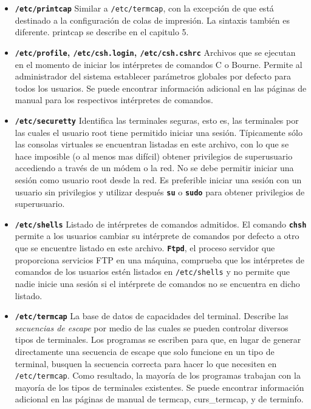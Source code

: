 \documentclass[12pt]{article}
\begin{document}
\begin{itemize}
	
	\item \textbf{\texttt{/etc/printcap}}
	 Similar a \texttt{/etc/termcap}, con la
	excepción de que está destinado a la configuración de colas de
	impresión. La sintaxis también es diferente.  printcap se describe en el
	capitulo 5.   
	

	
	\item \textbf{\texttt{/etc/profile},
	\texttt{/etc/csh.login},
	\texttt{/etc/csh.cshrc}}  Archivos
	que se ejecutan en el momento de iniciar los intérpretes de comandos C o
	Bourne. Permite al administrador del sistema establecer parámetros
	globales por defecto para todos los usuarios. Se puede encontrar
	información adicional 	en las páginas de manual para los respectivos
	intérpretes de comandos.  



	\item \textbf{\texttt{/etc/securetty}}
	 Identifica las terminales seguras, esto es, las
	terminales por las cuales el usuario root tiene permitido iniciar una
	sesión. Típicamente sólo las consolas virtuales se encuentran listadas
	en este archivo, con lo que se hace imposible (o al menos mas difícil)
	obtener privilegios de superusuario accediendo a través de un módem o la
	red. No se debe permitir iniciar una sesión como usuario root desde la
	red. Es preferible iniciar una sesión con un usuario sin privilegios y
	utilizar después \texttt{\textbf{su}} o \texttt{\textbf{sudo}} para
	obtener privilegios de superusuario.  



	\item \textbf{\texttt{/etc/shells}}
	 Listado de intérpretes de comandos admitidos.  El
	comando \texttt{\textbf{chsh}} permite a los usuarios cambiar su
	intérprete de comandos por defecto a otro que se encuentre listado en
	este archivo. \texttt{\textbf{Ftpd}}, el proceso servidor que
	proporciona 	servicios FTP en una máquina, comprueba que los
	intérpretes de comandos 		de los usuarios estén listados
	en \texttt{/etc/shells} y no 		permite que
	nadie inicie una sesión si el intérprete de comandos no se encuentra en
	dicho listado.  

	
	\item \textbf{\texttt{/etc/termcap}}
	 La base de datos de capacidades del terminal. Describe
	las \textit{secuencias de escape} por medio de 		las
	cuales se pueden controlar diversos tipos de terminales. Los programas
	se escriben para que, en lugar de generar directamente una secuencia de
	escape que solo funcione en un tipo de terminal, busquen la secuencia
	correcta para hacer lo que necesiten en
	\texttt{/etc/termcap}. 		Como resultado, la
	mayoría de los programas trabajan con la mayoría de los
	tipos de terminales existentes. Se puede encontrar información adicional
	en 	las páginas de manual de termcap, curs\_termcap, y de terminfo.
	

 \end{itemize} 
    
\end{document}
